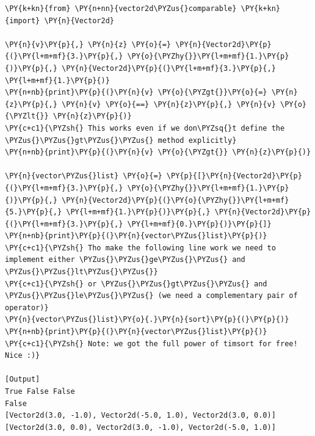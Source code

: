 \begin{Verbatim}[label=\makebox{\url{https://github.com/lucabaldini/cmepda/tree/master/slides/latex/snippets/test\_vector2d\_comparable.py}},commandchars=\\\{\}]
\PY{k+kn}{from} \PY{n+nn}{vector2d\PYZus{}comparable} \PY{k+kn}{import} \PY{n}{Vector2d}

\PY{n}{v}\PY{p}{,} \PY{n}{z} \PY{o}{=} \PY{n}{Vector2d}\PY{p}{(}\PY{l+m+mf}{3.}\PY{p}{,} \PY{o}{\PYZhy{}}\PY{l+m+mf}{1.}\PY{p}{)}\PY{p}{,} \PY{n}{Vector2d}\PY{p}{(}\PY{l+m+mf}{3.}\PY{p}{,} \PY{l+m+mf}{1.}\PY{p}{)}
\PY{n+nb}{print}\PY{p}{(}\PY{n}{v} \PY{o}{\PYZgt{}}\PY{o}{=} \PY{n}{z}\PY{p}{,} \PY{n}{v} \PY{o}{==} \PY{n}{z}\PY{p}{,} \PY{n}{v} \PY{o}{\PYZlt{}} \PY{n}{z}\PY{p}{)}
\PY{c+c1}{\PYZsh{} This works even if we don\PYZsq{}t define the \PYZus{}\PYZus{}gt\PYZus{}\PYZus{} method explicitly}
\PY{n+nb}{print}\PY{p}{(}\PY{n}{v} \PY{o}{\PYZgt{}} \PY{n}{z}\PY{p}{)}

\PY{n}{vector\PYZus{}list} \PY{o}{=} \PY{p}{[}\PY{n}{Vector2d}\PY{p}{(}\PY{l+m+mf}{3.}\PY{p}{,} \PY{o}{\PYZhy{}}\PY{l+m+mf}{1.}\PY{p}{)}\PY{p}{,} \PY{n}{Vector2d}\PY{p}{(}\PY{o}{\PYZhy{}}\PY{l+m+mf}{5.}\PY{p}{,} \PY{l+m+mf}{1.}\PY{p}{)}\PY{p}{,} \PY{n}{Vector2d}\PY{p}{(}\PY{l+m+mf}{3.}\PY{p}{,} \PY{l+m+mf}{0.}\PY{p}{)}\PY{p}{]}
\PY{n+nb}{print}\PY{p}{(}\PY{n}{vector\PYZus{}list}\PY{p}{)}
\PY{c+c1}{\PYZsh{} Tho make the following line work we need to implement either \PYZus{}\PYZus{}ge\PYZus{}\PYZus{} and \PYZus{}\PYZus{}lt\PYZus{}\PYZus{}}
\PY{c+c1}{\PYZsh{} or \PYZus{}\PYZus{}gt\PYZus{}\PYZus{} and \PYZus{}\PYZus{}le\PYZus{}\PYZus{} (we need a complementary pair of operator)}
\PY{n}{vector\PYZus{}list}\PY{o}{.}\PY{n}{sort}\PY{p}{(}\PY{p}{)}
\PY{n+nb}{print}\PY{p}{(}\PY{n}{vector\PYZus{}list}\PY{p}{)}
\PY{c+c1}{\PYZsh{} Note: we got the full power of timsort for free! Nice :)}

[Output]
True False False
False
[Vector2d(3.0, -1.0), Vector2d(-5.0, 1.0), Vector2d(3.0, 0.0)]
[Vector2d(3.0, 0.0), Vector2d(3.0, -1.0), Vector2d(-5.0, 1.0)]
\end{Verbatim}